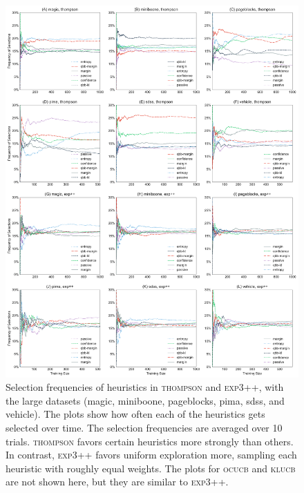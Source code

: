 \documentclass[fleqn,10pt,lineno]{wlpeerj} %
\begin{document}
\begin{figure}[tbp]
	\centering
	\includegraphics[width=\textwidth]{Fig10}
	\caption[Heuristic selection frequencies]{Selection frequencies of
	heuristics in \textsc{thompson} and \textsc{exp3++}, with the large
	datasets (magic, miniboone, pageblocks, pima, sdss, and vehicle). The plots
	show how often each of the heuristics gets selected over time. The
	selection frequencies are averaged over 10 trials. \textsc{thompson} favors
	certain heuristics more strongly than others. In contrast, \textsc{exp3++}
	favors uniform exploration more, sampling each heuristic with roughly equal
	weights. The plots for \textsc{ocucb} and \textsc{klucb} are not shown
	here, but they are similar to \textsc{exp3++}.}
	\label{fig:selection}
\end{figure}
\end{document}
